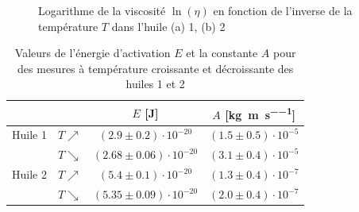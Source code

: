 \begin{figure}[h]
\begin{subfigure}{0.48\linewidth}
        \caption{}
        \label{fig:huile2_lneta}
    \end{subfigure}
    \caption{Logarithme de la viscosité \(\ln(\eta)\) en fonction de l'inverse de la température \(T\) dans l'huile (a) 1, (b) 2}
\end{figure}

\begin{table}[h]
    \centering
    \begin{tabulary}{0.8\linewidth}{C C|C C}
        \toprule
        & & \(E\) [\si{\joule}] & \(A\) [\si{\kilo\gram\per\meter\per\second}] \\
        \midrule
        Huile 1 & \(T \nearrow\) & \((2.9 \pm 0.2) \cdot 10^{-20}\) & \((1.5 \pm 0.5) \cdot 10^{-5}\) \\
        & \(T \searrow\) & \((2.68 \pm 0.06) \cdot 10^{-20}\) & \((3.1 \pm 0.4) \cdot 10^{-5}\) \\
        \midrule
        Huile 2 & \(T \nearrow\) & \((5.4 \pm 0.1) \cdot 10^{-20}\) & \((1.3 \pm 0.4) \cdot 10^{-7}\) \\
        & \(T \searrow\) & \((5.35 \pm 0.09) \cdot 10^{-20}\) & \((2.0 \pm 0.4) \cdot 10^{-7}\) \\
        \bottomrule
    \end{tabulary}
    \caption{Valeurs de l'énergie d'activation \(E\) et la constante \(A\) pour des mesures à température croissante et décroissante des huiles 1 et 2}
    \label{tab:energie_fit}
\end{table}
